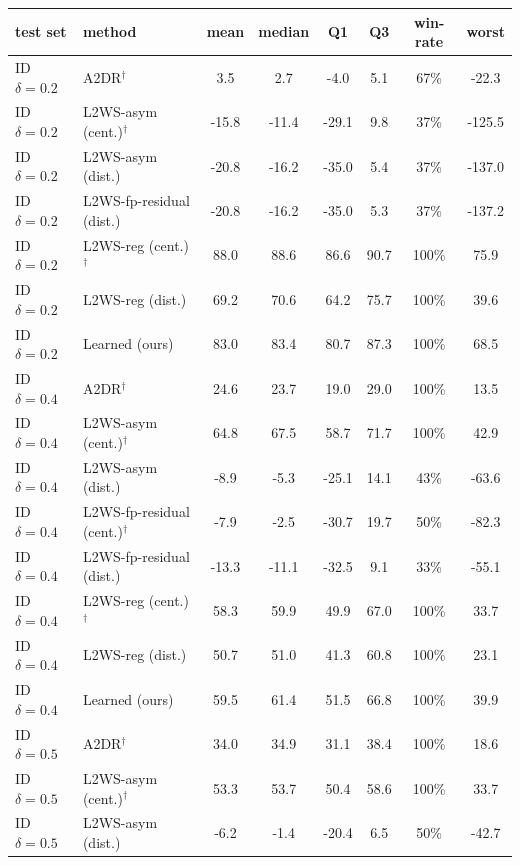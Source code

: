 
\begin{tabular}{llcccccc}
\toprule
test set & method & mean & median & Q1 & Q3 & win-rate & worst \\
\midrule
ID $\delta=0.2$ & A2DR$^\dagger$ & 3.5 & 2.7 & -4.0 & 5.1 & 67\% & -22.3 \\
ID $\delta=0.2$ & L2WS-asym (cent.)$^\dagger$ & -15.8 & -11.4 & -29.1 & 9.8 & 37\% & -125.5 \\
ID $\delta=0.2$ & L2WS-asym (dist.) & -20.8 & -16.2 & -35.0 & 5.4 & 37\% & -137.0 \\
ID $\delta=0.2$ & L2WS-fp-residual (dist.) & -20.8 & -16.2 & -35.0 & 5.3 & 37\% & -137.2 \\
ID $\delta=0.2$ & L2WS-reg (cent.)$^\dagger$ & 88.0 & 88.6 & 86.6 & 90.7 & 100\% & 75.9 \\
ID $\delta=0.2$ & L2WS-reg (dist.) & 69.2 & 70.6 & 64.2 & 75.7 & 100\% & 39.6 \\
ID $\delta=0.2$ & Learned (ours) & 83.0 & 83.4 & 80.7 & 87.3 & 100\% & 68.5 \\
ID $\delta=0.4$ & A2DR$^\dagger$ & 24.6 & 23.7 & 19.0 & 29.0 & 100\% & 13.5 \\
ID $\delta=0.4$ & L2WS-asym (cent.)$^\dagger$ & 64.8 & 67.5 & 58.7 & 71.7 & 100\% & 42.9 \\
ID $\delta=0.4$ & L2WS-asym (dist.) & -8.9 & -5.3 & -25.1 & 14.1 & 43\% & -63.6 \\
ID $\delta=0.4$ & L2WS-fp-residual (cent.)$^\dagger$ & -7.9 & -2.5 & -30.7 & 19.7 & 50\% & -82.3 \\
ID $\delta=0.4$ & L2WS-fp-residual (dist.) & -13.3 & -11.1 & -32.5 & 9.1 & 33\% & -55.1 \\
ID $\delta=0.4$ & L2WS-reg (cent.)$^\dagger$ & 58.3 & 59.9 & 49.9 & 67.0 & 100\% & 33.7 \\
ID $\delta=0.4$ & L2WS-reg (dist.) & 50.7 & 51.0 & 41.3 & 60.8 & 100\% & 23.1 \\
ID $\delta=0.4$ & Learned (ours) & 59.5 & 61.4 & 51.5 & 66.8 & 100\% & 39.9 \\
ID $\delta=0.5$ & A2DR$^\dagger$ & 34.0 & 34.9 & 31.1 & 38.4 & 100\% & 18.6 \\
ID $\delta=0.5$ & L2WS-asym (cent.)$^\dagger$ & 53.3 & 53.7 & 50.4 & 58.6 & 100\% & 33.7 \\
ID $\delta=0.5$ & L2WS-asym (dist.) & -6.2 & -1.4 & -20.4 & 6.5 & 50\% & -42.7 \\

\end{tabular}
